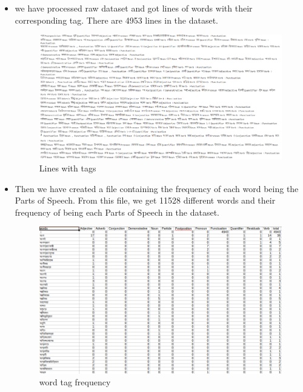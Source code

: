 \documentclass{standalone}
\begin{document}
\begin{itemize}
    \item we have processed raw dataset and got lines of words with their corresponding tag. There are 4953 lines in the dataset.
    \begin{figure}[H]
    \centering
    \includegraphics[width=1.0\columnwidth]{img/linesFinal.png}
    \caption{Lines with tags}
    \label{linesFinal}
    \end{figure}
\end{itemize}
\begin{itemize}
    \item Then we have created a file containing the frequency of each word being the Parts of Speech. From this file, we get 11528 different words and their frequency of being each Parts of Speech in the dataset.
     \begin{figure}[H]
    \centering
    \includegraphics[width=1.0\columnwidth]{img/worg-tag-frequency.png}
    \caption{word tag frequency}
    \label{wordtagfrequency}
    \end{figure}
\end{itemize}
\end{document}
